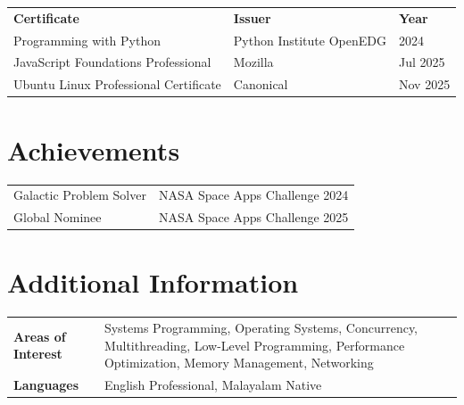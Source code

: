 \documentclass[a4paper,10pt]{article}
\begin{document}
\renewcommand{\arraystretch}{1.05}
\begin{tabular}{@{} p{7.8cm} p{6.5cm} p{2.5cm} @{}}
\textbf{Certificate}                  & \textbf{Issuer}              & \textbf{Year} \\[1pt]
Programming with Python               & Python Institute OpenEDG   & 2024 \\
JavaScript Foundations Professional   & Mozilla                      & Jul 2025 \\
Ubuntu Linux Professional Certificate & Canonical                    & Nov 2025 \\
\end{tabular}

\section*{Achievements}

\begin{tabular}{@{} p{9.5cm} p{8cm} @{}}
Galactic Problem Solver              & NASA Space Apps Challenge 2024 \\
Global Nominee                       & NASA Space Apps Challenge 2025 \\
\end{tabular}

\section*{Additional Information}

\begin{tabular}{@{} >{\bfseries}p{3.8cm} p{13cm} @{}}
Areas of Interest & Systems Programming, Operating Systems, Concurrency, Multithreading, Low-Level Programming, Performance Optimization, Memory Management, Networking \\
Languages         & English Professional, Malayalam Native \\
\end{tabular}

\vspace{3pt}
\end{document}

